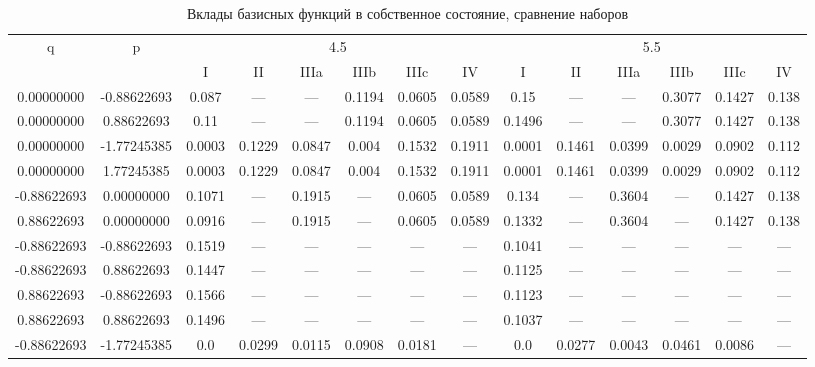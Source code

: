 \documentclass[a4paper,14pt]{extarticle}
\begin{document}
\begin{landscape}
\begin{table}[H]
\centering
\caption{Вклады базисных функций в собственное состояние, сравнение наборов}
\begin{tabular}{|c|c|*{6}{c}|*{6}{c}|}
\hline
\multirow{2}{*}{q} & \multirow{2}{*}{p} & \multicolumn{6}{|c|}{4.5}                           & \multicolumn{6}{|c|}{5.5}                          \\
\cline{3-14}
                   &                    & I      & II     & IIIa   & IIIb   & IIIc   & IV     & I      & II     & IIIa   & IIIb   & IIIc   & IV    \\ 
\hline
 0.00000000        & -0.88622693        & 0.087  & ---    & ---    & 0.1194 & 0.0605 & 0.0589 & 0.15   & ---    & ---    & 0.3077 & 0.1427 & 0.138 \\ 
 0.00000000        &  0.88622693        & 0.11   & ---    & ---    & 0.1194 & 0.0605 & 0.0589 & 0.1496 & ---    & ---    & 0.3077 & 0.1427 & 0.138 \\
 0.00000000        & -1.77245385        & 0.0003 & 0.1229 & 0.0847 & 0.004  & 0.1532 & 0.1911 & 0.0001 & 0.1461 & 0.0399 & 0.0029 & 0.0902 & 0.112 \\
 0.00000000        &  1.77245385        & 0.0003 & 0.1229 & 0.0847 & 0.004  & 0.1532 & 0.1911 & 0.0001 & 0.1461 & 0.0399 & 0.0029 & 0.0902 & 0.112 \\
-0.88622693        &  0.00000000        & 0.1071 & ---    & 0.1915 & ---    & 0.0605 & 0.0589 & 0.134  & ---    & 0.3604 & ---    & 0.1427 & 0.138 \\
 0.88622693        &  0.00000000        & 0.0916 & ---    & 0.1915 & ---    & 0.0605 & 0.0589 & 0.1332 & ---    & 0.3604 & ---    & 0.1427 & 0.138 \\
-0.88622693        & -0.88622693        & 0.1519 & ---    & ---    & ---    & ---    & ---    & 0.1041 & ---    & ---    & ---    & ---    & ---   \\
-0.88622693        &  0.88622693        & 0.1447 & ---    & ---    & ---    & ---    & ---    & 0.1125 & ---    & ---    & ---    & ---    & ---   \\
 0.88622693        & -0.88622693        & 0.1566 & ---    & ---    & ---    & ---    & ---    & 0.1123 & ---    & ---    & ---    & ---    & ---   \\
 0.88622693        &  0.88622693        & 0.1496 & ---    & ---    & ---    & ---    & ---    & 0.1037 & ---    & ---    & ---    & ---    & ---   \\
-0.88622693        & -1.77245385        & 0.0    & 0.0299 & 0.0115 & 0.0908 & 0.0181 & ---    & 0.0    & 0.0277 & 0.0043 & 0.0461 & 0.0086 & ---   \\

\end{tabular}
\end{table}
\end{landscape}
\end{document}

